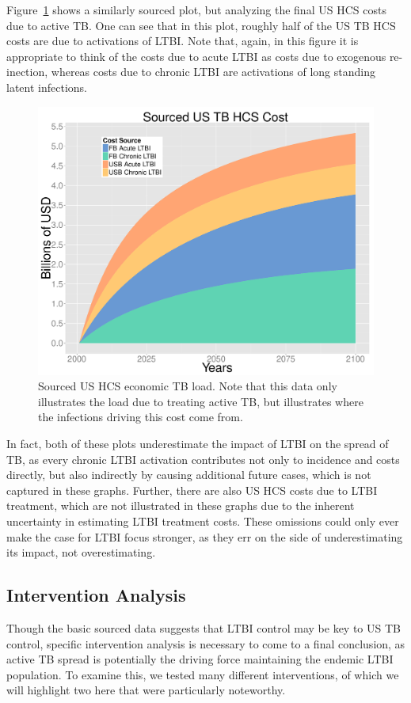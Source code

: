 \documentclass{amsart}
\renewcommand{\(}{\left(}
\renewcommand{\)}{\right)}
\begin{document}
Figure~\ref{fig:costPlotSourced} shows a similarly sourced plot, but analyzing the
final US HCS costs due to active TB. One can see that in this plot, roughly half
of the US TB HCS costs are due to activations of LTBI. Note that, again, in this
figure it is appropriate to think of the costs due to acute LTBI as costs due to
exogenous re-inection, whereas costs due to chronic LTBI are activations of long
standing latent infections. 
\begin{figure}[h]
  \begin{center}
    \includegraphics[scale=.35]{costPlotSourced}
  \end{center}
  \caption{Sourced US HCS economic TB load. Note that this data only illustrates
    the load due to treating active TB, but illustrates where the infections
    driving this cost come from.}
  \label{fig:costPlotSourced}
\end{figure}

In fact, both of these plots underestimate the impact of LTBI on the spread of
TB, as every chronic LTBI activation contributes not only to incidence and costs
directly, but also indirectly by causing additional future cases, which is not
captured in these graphs. Further, there are also US HCS costs due to LTBI
treatment, which are not illustrated in these graphs due to the inherent
uncertainty in estimating LTBI treatment costs. These omissions could only ever
make the case for LTBI focus stronger, as they err on the side of
underestimating its impact, not overestimating.
\subsection{Intervention Analysis}
Though the basic sourced data suggests that LTBI control may be key to US TB
control, specific intervention analysis is necessary to come to a final
conclusion, as active TB spread is potentially the driving force maintaining the
endemic LTBI population. To examine this, we tested many different
interventions, of which we will highlight two here that were particularly
noteworthy. 
\end{document}
